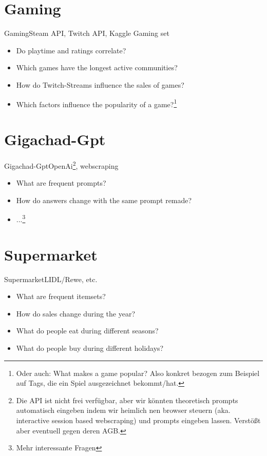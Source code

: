     \section{Gaming}
    \begin{frame}{Gaming}{Steam API, Twitch API, Kaggle Gaming set}
        \begin{itemize}[<+->]
            \item Do playtime and ratings correlate?
            \item Which games have the longest active communities?
            \item How do Twitch-Streams influence the sales of games?
            \item Which factors influence the popularity of a game?\footnote{Oder auch: What makes a game popular? Also konkret bezogen zum Beispiel auf Tags, die ein Spiel ausgezeichnet bekommt/hat.}
        \end{itemize}
    \end{frame}

    \section{Gigachad-Gpt}
    \begin{frame}{Gigachad-Gpt}{OpenAi\footnote{Die API ist nicht frei verfügbar, aber wir könnten theoretisch prompts automatisch eingeben indem wir heimlich nen  browser steuern (aka. interactive session based webscraping) und prompts eingeben lassen. Verstößt aber eventuell gegen deren AGB.}, webscraping}
        \begin{itemize}[<+->]
            \item What are frequent prompts?
            \item How do answers change with the same prompt remade?
            \item ...\footnote{Mehr interessante Fragen}
        \end{itemize}
    \end{frame}

    \section{Supermarket}
    \begin{frame}{Supermarket}{LIDL/Rewe, etc.}
        \begin{itemize}[<+->]
            \item What are frequent itemsets?
            \item How do sales change during the year?
            \item What do people eat during different seasons?
            \item What do people buy during different holidays?
        \end{itemize}
    \end{frame}

